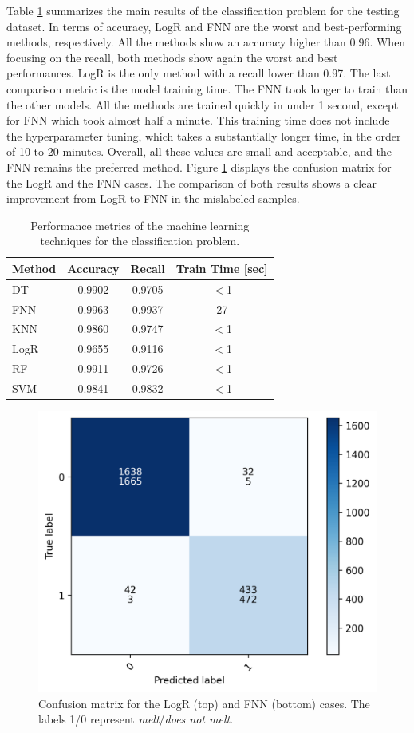 Table \ref{tab:results-1} summarizes the main results of the classification problem for the testing dataset.
In terms of accuracy, LogR and FNN are the worst and best-performing methods, respectively.
All the methods show an accuracy higher than 0.96.
When focusing on the recall, both methods show again the worst and best performances.
LogR is the only method with a recall lower than 0.97.
The last comparison metric is the model training time.
The FNN took longer to train than the other models.
All the methods are trained quickly in under 1 second, except for FNN which took almost half a minute.
This training time does not include the hyperparameter tuning, which takes a substantially longer time, in the order of 10 to 20 minutes.
Overall, all these values are small and acceptable, and the FNN remains the preferred method.
Figure \ref{fig:cnfm} displays the confusion matrix for the LogR and the FNN cases.
The comparison of both results shows a clear improvement from LogR to FNN in the mislabeled samples.

\begin{table}[htbp!]
  \centering
  \caption{Performance metrics of the machine learning techniques for the classification problem.}
  \label{tab:results-1}
  \begin{tabular}{lccc}
    \toprule
    Method & Accuracy & Recall & Train Time [sec] \\
    \midrule
    DT      & 0.9902 & 0.9705 & $<$1 \\
    FNN     & 0.9963 & 0.9937 & 27 \\
    KNN     & 0.9860 & 0.9747 & $<$1 \\
    LogR    & 0.9655 & 0.9116 & $<$1 \\
    RF      & 0.9911 & 0.9726 & $<$1 \\
    SVM     & 0.9841 & 0.9832 & $<$1 \\
    \bottomrule
  \end{tabular}
\end{table}

\begin{figure}[htbp!] %
    \centering
    \includegraphics[width=0.45\linewidth]{figures/classification_cnfm.png}
    \hfill
    \caption{Confusion matrix for the LogR (top) and FNN (bottom) cases. The labels 1/0 represent \textit{melt}/\textit{does not melt}.}
    \label{fig:cnfm}
\end{figure}

